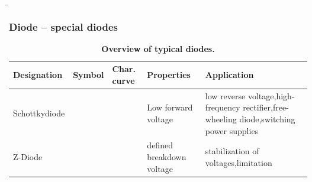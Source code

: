 \begin{frame}
    \renewcommand{\tablename}{Table}
    \b{
        \frametitle{Diode -- special diodes}
        \begin{table}[H]
            \centering 
            \begin{tabular}{ |p{2.1cm}|p{1.4cm}|p{3.2cm}|p{2.8cm}|p{3cm}| }
                \hline
                \textbf{Designation} & \textbf{Symbol} & \textbf{Char. curve} & \textbf{Properties} & \textbf{Application} \\
                \hline
                Schottky\-diode
                &
                \begin{minipage}[t][2.6cm][c]{1.4cm}
                    \centering 
                \end{minipage}
                & 
                \begin{minipage}[t][2.6cm][c]{3.3cm}
                    \centering 
                \end{minipage}
                & 
                Low forward voltage &
                low reverse voltage,\newline high-frequency rectifier,\newline free-wheeling diode,\newline switching power supplies\\
                \hline
                Z-Diode
                &
                \begin{minipage}[t][2.6cm][c]{1.4cm}
                    \centering 
                \end{minipage}
                & 
                \begin{minipage}[t][2.6cm][c]{3.3cm}
                    \centering 
                \end{minipage}
                & 
                defined breakdown voltage &
                stabilization of voltages,\newline limitation\\
                \hline
            \end{tabular}
            \caption{\textbf{Overview of typical diodes.}}
        \end{table}
    }

\end{frame}

